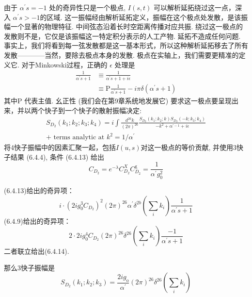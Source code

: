 由于 $\alpha^{\prime} s=-1$ 处的奇异性只是一个极点, $I(s, t)$ 可以解析延拓绕过这一点，深入 $\alpha^{\prime} s>-1 $的区域.  这一振幅经由解析延拓定义，振幅在这个极点处发散，是该振幅一个显著的物理特征. 中间弦态沿着长时空距离传播对应共振. 绕过这一极点的发散则不是，它仅是该振幅这一特定积分表示的人工产物. 延拓不造成任何问题. 事实上，我们将看到每一弦发散都是这一基本形式，所以这种解析延拓移去了所有发散————当然，要除去极点本身的发散. 极点在实轴上，我们需要更精准的定义它. 对于Minkowski过程，正确的 $\epsilon$ 处理是
\begin{equation}
	\begin{aligned}
		\frac{1}{\alpha^{\prime} s+1} & \equiv \frac{1}{\alpha^{\prime} s+1+i \epsilon} \\
		& \equiv \mathrm{P} \frac{1}{\alpha^{\prime} s+1}-i \pi \delta\left(\alpha^{\prime} s+1\right)
	\end{aligned}
\end{equation}
其中$\mathrm{P}$ 代表主值. 幺正性 (我们会在第9章系统地发展它) 要求这一极点要呈现出来，并以两个快子到一个快子的散射振幅决定:
\begin{equation}
	\begin{array}{r}
		S_{D_{2}}\left(k_{1} ; k_{2} ; k_{3} ; k_{4}\right)=i \int \frac{d^{26} k}{(2 \pi)^{26}} \frac{S_{D_{2}}\left(k_{1} ; k_{2} ; k\right) S_{D_{2}}\left(-k ; k_{3} ; k_{4}\right)}{-k^{2}+\alpha^{\prime-1}+i \epsilon} \\
		+\text { terms analytic at } k^{2}=1 / \alpha^{\prime}
	\end{array}
\end{equation}
将4快子振幅中的因素汇聚一起，包括$I(u, s)$对这一极点的等价贡献, 并使用3快子结果 (6.4.4), 条件 (6.4.13) 给出
\begin{equation}
	C_{D_{2}}=e^{-\lambda} C_{D_{2}}^{X} C_{D_{2}}^{\mathrm{g}}=\frac{1}{\alpha^{\prime} g_{0}^{2}}
\end{equation}
\begin{remark}
(6.4.13)给出的奇异项：
$$
i \cdot\left(2 i g_{0}^{3} C_{D_{2}}\right)^{2}(2 \pi)^{26} \alpha^{\prime} \delta^{2 b}\left(\sum_{i} k_{i}\right) \frac{1}{\alpha^{\prime} s+1}
$$
(6.4.9)给出的奇异项：
$$
2 \cdot 2 i g_{0}^{4} C_{D_{2}}(2 \pi)^{26} \delta^{26}\left(\sum_{i} k_{i}\right) \frac{-1}{\alpha^{\prime} s+1}
$$
二者联立给出(6.4.14).
\end{remark}
那么3快子振幅是
\begin{equation}
	S_{D_{2}}\left(k_{1} ; k_{2} ; k_{3}\right)=\frac{2 i g_{\mathrm{o}}}{\alpha^{\prime}}(2 \pi)^{26} \delta^{26}\left(\sum_{i} k_{i}\right)
\end{equation}

